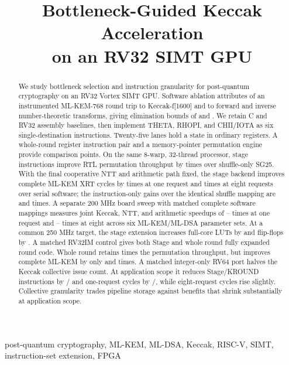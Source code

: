 \documentclass[conference,letterpaper]{IEEEtran}
\title{Bottleneck-Guided Keccak Acceleration\\on an RV32 SIMT GPU}
\author{\IEEEauthorblockN{Anonymous authors}
\IEEEauthorblockA{Working draft --- September 2026}}
\begin{document}
\maketitle
\begin{abstract}
We study bottleneck selection and instruction granularity for post-quantum
cryptography on an RV32 Vortex SIMT GPU. Software ablation attributes
\MlkKeccakShare{} of an instrumented ML-KEM-768 round trip to Keccak-f[1600]
and \MlkNttShare{} to forward and inverse number-theoretic transforms,
giving elimination bounds of \MlkKeccakBound{} and \MlkNttBound{}.
We retain C and RV32 assembly baselines, then implement THETA, RHOPI, and
CHII/IOTA as six single-destination instructions. Twenty-five lanes hold
a state in ordinary registers. A whole-round register instruction pair
and a memory-pointer permutation engine provide comparison points.
On the same 8-warp, 32-thread processor, stage instructions improve RTL
permutation throughput by \StageThroughputGain{} times over shuffle-only SG25.
With the final cooperative NTT and arithmetic path fixed, the stage backend
improves complete ML-KEM XRT cycles by \UnifiedStageOne{} times at one request
and \UnifiedStageEight{} times at eight requests over serial software;
the instruction-only gains over the identical shuffle mapping are
\UnifiedIseOne{} and \UnifiedIseEight{} times.
A separate 200 MHz board sweep with matched complete software mappings
measures joint Keccak, NTT, and arithmetic speedups of
\BoardMinOne{}--\BoardMaxOne{} times at one request and
\BoardMinEight{}--\BoardMaxEight{} times at eight across six ML-KEM/ML-DSA
parameter sets.
At a common 250 MHz target, the stage extension increases full-core LUTs by
\StageLutOverhead{} and flip-flops by \StageFfOverhead{}. A matched RV32IM
control gives both Stage and whole round fully expanded round code.
Whole round retains \MatchedRoundGainEight{} times the permutation throughput,
but improves complete ML-KEM by only \MatchedRoundKemGainOne{} and
\MatchedRoundKemGainEight{} times.
A matched integer-only RV64 port halves the Keccak collective issue count.
At application scope it reduces Stage/KROUND instructions by
\RvSixtyFourStageInstructionReduction{}/\RvSixtyFourRoundInstructionReduction{}
and one-request cycles by
\RvSixtyFourStageMOneCycleReduction{}/\RvSixtyFourRoundMOneCycleReduction{},
while eight-request cycles rise slightly.
Collective granularity trades pipeline storage against benefits that
shrink substantially at application scope.
\end{abstract}
\begin{IEEEkeywords}
post-quantum cryptography, ML-KEM, ML-DSA, Keccak, RISC-V, SIMT,
instruction-set extension, FPGA
\end{IEEEkeywords}
\end{document}
